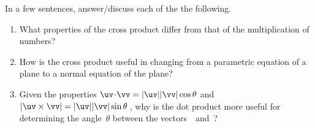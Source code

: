 \begin{exercise} \label{ex:} 
In a few sentences, answer\slash discuss each of the the following.
\begin{enumerate}
\item What properties of the cross product differ from that of the multiplication of numbers?  

\item How is the cross product useful in changing from a parametric equation of a plane to a normal equation of the plane?

\item Given the properties \(\uv\cdot\vv=|\uv||\vv|\cos\theta\) and \(|\uv\times\vv|=|\uv||\vv|\sin\theta\)\,, why is the dot product more useful for determining the angle~\(\theta\) between the vectors~\uv\ and~\vv?

\end{enumerate}
\end{exercise}

\begin{comment}%
why, what caused X?
how did X occur?
what-if? what-if-not?
how does X compare with Y?
what is the evidence for X?
why is X important?
\end{comment}
